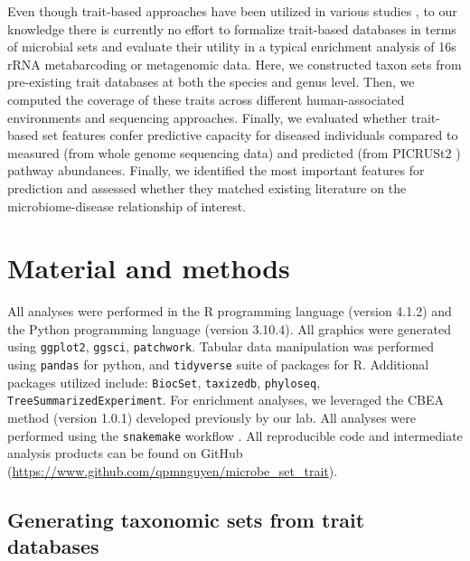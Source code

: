 Even though trait-based approaches have been utilized in various studies \cite{weissman2021exploring, bewick2019traitbased, guittar2019traitbased, krause2014traitbased}, to our knowledge there is currently no effort to formalize trait-based databases in terms of microbial sets and evaluate their utility in a typical enrichment analysis of 16s rRNA metabarcoding or metagenomic data. Here, we constructed taxon sets from pre-existing trait databases at both the species and genus level. Then, we computed the coverage of these traits across different human-associated environments and sequencing approaches. Finally, we evaluated whether trait-based set features confer predictive capacity for diseased individuals compared to measured (from whole genome sequencing data) and predicted (from PICRUSt2 \cite{douglas2020picrust2}) pathway abundances. Finally, we identified the most important features for prediction and assessed whether they matched existing literature on the microbiome-disease relationship of interest.  


\section{Material and methods} \label{methods}

All analyses were performed in the R programming language (version 4.1.2) \cite{rcoreteam2021language} and the Python programming language (version 3.10.4). All graphics were generated using \texttt{ggplot2}, \texttt{ggsci}, \texttt{patchwork}. Tabular data manipulation was performed using \texttt{pandas} for python, and \texttt{tidyverse} suite of packages for R. Additional packages utilized include: \texttt{BiocSet}, \texttt{taxizedb}, \texttt{phyloseq}, \texttt{TreeSummarizedExperiment}. For enrichment analyses, we leveraged the CBEA \cite{nguyen2021cbea} method (version 1.0.1) developed previously by our lab. All analyses were performed using the \texttt{snakemake} workflow \cite{molder2021sustainable}. All reproducible code and intermediate analysis products can be found on GitHub (\url{https://www.github.com/qpmnguyen/microbe_set_trait}).  

\subsection{Generating taxonomic sets from trait databases}  

